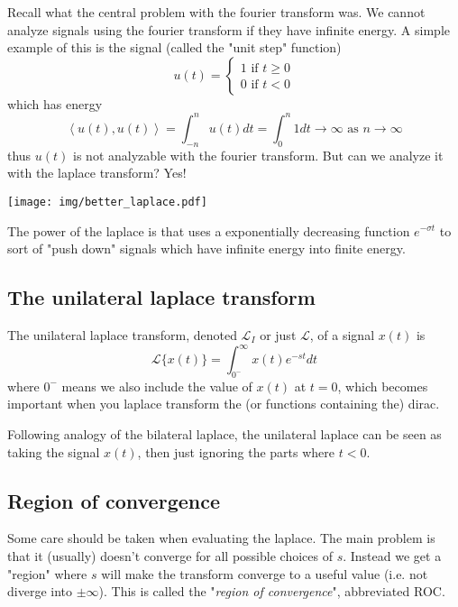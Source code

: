 \documentclass{article}
\newcommand{\0}{{\mathbf{0}}}
\newcommand{\inner}[1]{\left\langle #1 \right\rangle}
\begin{document}
Recall what the central problem with the fourier transform was. We cannot analyze signals using the fourier transform if they have infinite energy.
A simple example of this is the signal (called the "unit step" function)
$$ u(t) =
\begin{cases}
  1\text{ if } t\ge 0\\
  0\text{ if } t< 0
\end{cases}
$$
which has energy
$$ \inner{u(t), u(t)} = \int^{n}_{-n}u(t) dt = \int^{n}_{0} 1 dt \to \infty \text{ as } n\to \infty$$
thus $u(t)$ is not analyzable with the fourier transform. But can we analyze it with the laplace transform? Yes!

\begin{center}
  \texttt{[image: img/better\_laplace.pdf]}
\end{center}

The power of the laplace is that uses a exponentially decreasing function $e^{-\sigma t}$ to sort of "push down" signals which have infinite energy
into finite energy.

\clearpage
\subsection{The unilateral laplace transform}
The unilateral laplace transform, denoted $\mathscr{L}_{I}$ or just $\mathscr{L}$, of a signal $x(t)$ is
$$ \mathscr{L} \{ x(t) \} = \int^{\infty}_{0^{-}} x(t)e^{-st} dt $$
where $0^{-}$ means we also include the value of $x(t)$ at $t=0$, which becomes important when you laplace transform the (or functions
containing the) dirac.

Following analogy of the bilateral laplace, the unilateral laplace can be seen as taking the signal $x(t)$, then just ignoring
the parts where $t<0$.

\subsection{Region of convergence}
Some care should be taken when evaluating the laplace.
The main problem is that it (usually) doesn't converge for all possible choices of $s$.
Instead we get a "region" where $s$ will make the transform converge to a useful value (i.e. not diverge into $\pm\infty$). This
is called the "\textit{region of convergence}", abbreviated ROC.
\end{document}
